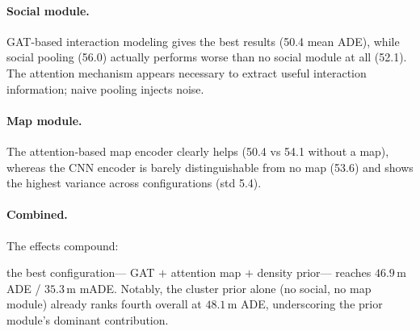 \documentclass[runningheads]{preamp/llncs}
\begin{document}
\paragraph{Social module.}
GAT-based interaction modeling gives the best results (50.4 mean ADE),
while social pooling (56.0) actually performs worse than no social module at all (52.1).
The attention mechanism appears necessary to extract useful interaction information; naive pooling injects noise.

\paragraph{Map module.}
The attention-based map encoder clearly helps (50.4 vs 54.1 without a map),
whereas the CNN encoder is barely distinguishable from no map
(53.6) and shows the highest variance across configurations (std 5.4).

\paragraph{Combined.}
The effects compound:

the best configuration---%
GAT $+$ attention map $+$ density prior---%
reaches $46.9$\,m \ac{ADE} / $35.3$\,m \ac{mADE}.
Notably, the cluster prior alone (no social, no map module) already ranks fourth overall
at $48.1$\,m \ac{ADE}, underscoring the prior module's dominant contribution.
\end{document}
